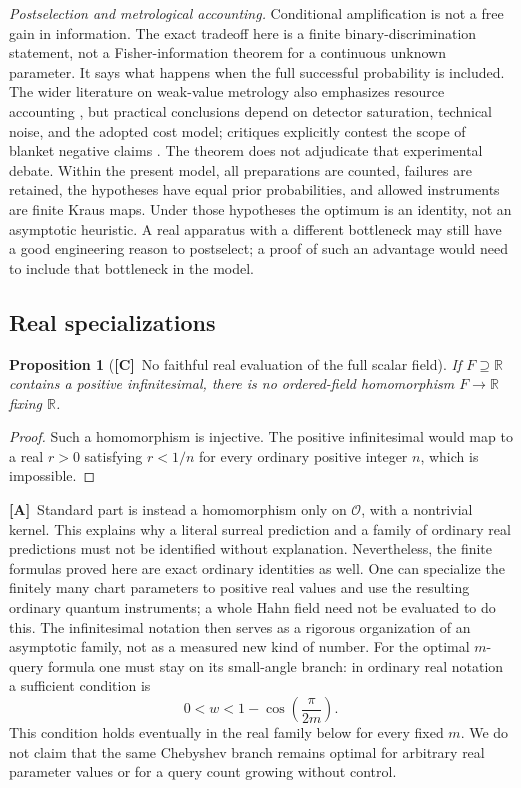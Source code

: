 \documentclass[11pt,oneside]{article}
\numberwithin{equation}{section}
\theoremstyle{plain}
\newtheorem{proposition}[proposition]{Proposition}
\theoremstyle{definition}
\theoremstyle{remark}
\newcommand{\R}{\mathbb R}
\newcommand{\OO}{\mathcal O}
\newcommand{\TC}{\textcolor{TierC}{\textsf{\bfseries[C]}}}
\newcommand{\TA}{\textcolor{TierA}{\textsf{\bfseries[A]}}}
\begin{document}
\emph{Postselection and metrological accounting.} Conditional amplification is not a free gain in information. The exact tradeoff here is a finite binary-discrimination statement, not a Fisher-information theorem for a continuous unknown parameter. It says what happens when the full successful probability is included. The wider literature on weak-value metrology also emphasizes resource accounting \cite{FerrieCombes}, but practical conclusions depend on detector saturation, technical noise, and the adopted cost model; critiques explicitly contest the scope of blanket negative claims \cite{Vaidman}. The theorem does not adjudicate that experimental debate. Within the present model, all preparations are counted, failures are retained, the hypotheses have equal prior probabilities, and allowed instruments are finite Kraus maps. Under those hypotheses the optimum is an identity, not an asymptotic heuristic. A real apparatus with a different bottleneck may still have a good engineering reason to postselect; a proof of such an advantage would need to include that bottleneck in the model.

\subsection{Real specializations}\label{qgs:hol:sec:real}
\begin{proposition}[\TC\ No faithful real evaluation of the full scalar field]\label{qgs:hol:prop:noeval}
If $F\supseteq\R$ contains a positive infinitesimal, there is no ordered-field homomorphism $F\to\R$ fixing $\R$.
\end{proposition}
\begin{proof}
Such a homomorphism is injective. The positive infinitesimal would map to a real $r>0$ satisfying $r<1/n$ for every ordinary positive integer $n$, which is impossible.
\end{proof}

\TA\ Standard part is instead a homomorphism only on $\OO$, with a nontrivial kernel. This explains why a literal surreal prediction and a family of ordinary real predictions must not be identified without explanation. Nevertheless, the finite formulas proved here are exact ordinary identities as well. One can specialize the finitely many chart parameters to positive real values and use the resulting ordinary quantum instruments; a whole Hahn field need not be evaluated to do this. The infinitesimal notation then serves as a rigorous organization of an asymptotic family, not as a measured new kind of number. For the optimal $m$-query formula one must stay on its small-angle branch: in ordinary real notation a sufficient condition is
\[
 0<w<1-\cos\!\left(\frac{\pi}{2m}\right).
\]
This condition holds eventually in the real family below for every fixed $m$. We do not claim that the same Chebyshev branch remains optimal for arbitrary real parameter values or for a query count growing without control.
\end{document}
